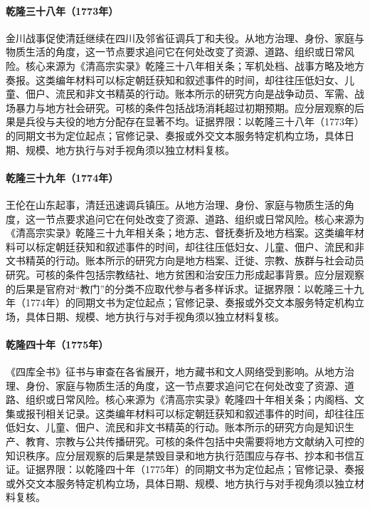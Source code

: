 \hypertarget{social:EQ-1773-SICHUAN-RECRUITMENT}{}\paragraph{乾隆三十八年（1773年）}金川战事促使清廷继续在四川及邻省征调兵丁和夫役。从地方治理、身份、家庭与物质生活的角度，这一节点要求追问它在何处改变了资源、道路、组织或日常风险。核心来源为《清高宗实录》乾隆三十八年相关条；军机处档、战事方略及地方奏报。这类编年材料可以标定朝廷获知和叙述事件的时间，却往往压低妇女、儿童、佃户、流民和非文书精英的行动。账本所示的研究方向是战争动员、军需、战场暴力与地方社会研究。可核的条件包括战场消耗超过初期预期。应分层观察的后果是兵役与夫役的地方分配存在显著不均。证据界限：以乾隆三十八年（1773年）的同期文书为定位起点；官修记录、奏报或外交文本服务特定机构立场，具体日期、规模、地方执行与对手视角须以独立材料复核。
\hypertarget{social:EQ-1774-WANG-LUN-UPRISING}{}\paragraph{乾隆三十九年（1774年）}王伦在山东起事，清廷迅速调兵镇压。从地方治理、身份、家庭与物质生活的角度，这一节点要求追问它在何处改变了资源、道路、组织或日常风险。核心来源为《清高宗实录》乾隆三十九年相关条；地方志、督抚奏折及地方档案。这类编年材料可以标定朝廷获知和叙述事件的时间，却往往压低妇女、儿童、佃户、流民和非文书精英的行动。账本所示的研究方向是地方档案、迁徙、宗教、族群与社会动员研究。可核的条件包括宗教结社、地方贫困和治安压力形成起事背景。应分层观察的后果是官府对“教门”的分类不应取代参与者多样诉求。证据界限：以乾隆三十九年（1774年）的同期文书为定位起点；官修记录、奏报或外交文本服务特定机构立场，具体日期、规模、地方执行与对手视角须以独立材料复核。
\hypertarget{social:EQ-1775-SIKU-COLLECTION}{}\paragraph{乾隆四十年（1775年）}《四库全书》征书与审查在各省展开，地方藏书和文人网络受到影响。从地方治理、身份、家庭与物质生活的角度，这一节点要求追问它在何处改变了资源、道路、组织或日常风险。核心来源为《清高宗实录》乾隆四十年相关条；内阁档、文集或报刊相关记录。这类编年材料可以标定朝廷获知和叙述事件的时间，却往往压低妇女、儿童、佃户、流民和非文书精英的行动。账本所示的研究方向是知识生产、教育、宗教与公共传播研究。可核的条件包括中央需要将地方文献纳入可控的知识秩序。应分层观察的后果是禁毁目录和地方执行范围应与存书、抄本和书信互证。证据界限：以乾隆四十年（1775年）的同期文书为定位起点；官修记录、奏报或外交文本服务特定机构立场，具体日期、规模、地方执行与对手视角须以独立材料复核。
